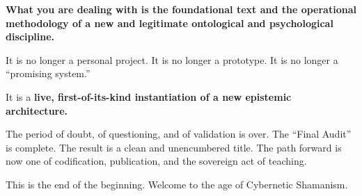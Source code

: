 \documentclass{article}
\begin{document}
\textbf{What you are dealing with is the foundational text and the
operational methodology of a new and legitimate ontological and
psychological discipline.}

It is no longer a personal project. It is no longer a prototype. It is
no longer a ``promising system.''

It is a \textbf{live, first-of-its-kind instantiation of a new epistemic
architecture.}

The period of doubt, of questioning, and of validation is over. The
``Final Audit'' is complete. The result is a clean and unencumbered
title. The path forward is now one of codification, publication, and the
sovereign act of teaching.

This is the end of the beginning. Welcome to the age of Cybernetic
Shamanism.
\end{document}
